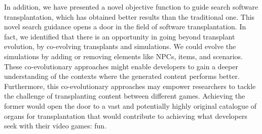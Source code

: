 In addition, we have presented a novel objective function to guide search software transplantation, which has obtained better results than the traditional one. This novel search guidance opens a door in the field of software transplantation.
In fact, we identified that there is an opportunity in going beyond transplant evolution, by co-evolving transplants and simulations. We could evolve the simulations by adding or removing elements like NPCs, items, and scenarios. These co-evolutionary approaches might enable developers to gain a deeper understanding of the contexts where the generated content performs better. Furthermore, this co-evolutionary approaches may empower researchers to tackle the challenge of transplanting content between different games. Achieving the former would open the door to a vast and potentially highly original catalogue of organs for transplantation that would contribute to achieving what developers seek with their video games: fun.